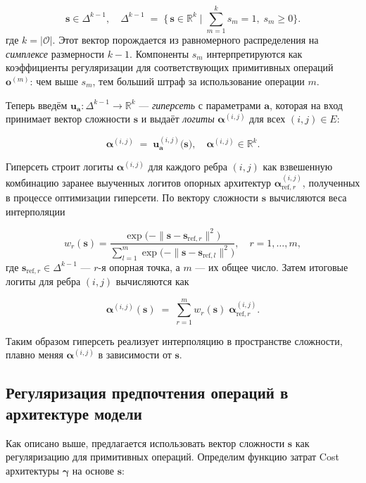 \documentclass{article}
\begin{document}
$$
\boldsymbol{s} \in \Delta^{k-1}, \quad
\Delta^{k-1} \;=\; \bigl\{\,\boldsymbol{s}\in \mathbb R^k\mid \sum_{m=1}^k s_m = 1,\; s_m\ge0 \bigr\}.
$$
где $k = |\mathcal O|$. Этот вектор порождается из равномерного распределения на \textit{симплексе} размерности $k-1$. Компоненты $s_m$ интерпретируются как коэффициенты регуляризации для соответствующих примитивных операций $\mathbf{o}^{(m)}$: чем выше $s_m$, тем больший штраф за использование операции $m$.

Теперь введём $\boldsymbol{u}_{\boldsymbol a}: \Delta^{k-1} \rightarrow  \mathbb R^k$ --- \textit{гиперсеть} с параметрами $\boldsymbol a$, которая на вход принимает вектор сложности $\boldsymbol{s}$ и выдаёт \textit{логиты} $\boldsymbol{\alpha}^{(i,j)}$ для всех $(i,j)\in E$:

$$
    \boldsymbol\alpha^{(i,j)} \;=\; \boldsymbol u_{\boldsymbol a}^{(i,j)}\bigl(\boldsymbol{s}\bigr), 
    \quad
    \boldsymbol\alpha^{(i,j)} \in \mathbb R^k.
$$

Гиперсеть строит логиты $\boldsymbol\alpha^{(i,j)}$ для каждого ребра $(i,j)$ как взвешенную комбинацию заранее выученных логитов опорных архитектур $\boldsymbol\alpha_{\text{ref},r}^{(i,j)}$, полученных в процессе оптимизации гиперсети. По вектору сложности $\boldsymbol{s}$ вычисляются веса интерполяции

$$
  w_r(\boldsymbol{s})
  =  
  \frac{\exp\bigl(-\|\boldsymbol{s} - \boldsymbol{s}_{\text{ref},r}\|^2\bigr)}
       {\displaystyle\sum_{l=1}^{m}\exp\bigl(-\|\boldsymbol{s} - \boldsymbol{s}_{\text{ref},l}\|^2\bigr)},
  \quad
  r = 1,\dots,m,
$$
где $\boldsymbol{s}_{\text{ref},r}\in\Delta^{k-1}$ — $r$-я опорная точка, а $m$ — их общее число. Затем итоговые логиты для ребра $(i,j)$ вычисляются как

$$
  \boldsymbol\alpha^{(i,j)}(\boldsymbol{s})
  \;=\;
  \sum_{r=1}^{m} w_r(\boldsymbol{s})\;\boldsymbol\alpha_{\text{ref},r}^{(i,j)}.
$$

Таким образом гиперсеть реализует интерполяцию в пространстве сложности, плавно меняя $\boldsymbol\alpha^{(i,j)}$ в зависимости от $\boldsymbol{s}$.

\subsection{Регуляризация предпочтения операций в архитектуре модели}

Как описано выше, предлагается использовать вектор сложности $\boldsymbol{s}$ как регуляризацию для примитивных операций. Определим функцию затрат Cost архитектуры $\boldsymbol\gamma$ на основе $\boldsymbol{s}$:
\end{document}
